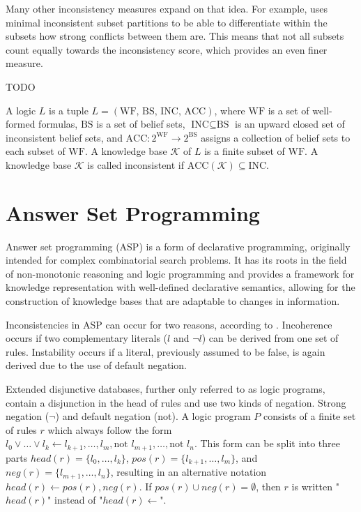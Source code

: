Many other inconsistency measures expand on that idea. For example, \cite{jabbour_mis_2016} uses minimal inconsistent subset partitions to be able to differentiate within the subsets how strong conflicts between them are. This means that not all subsets count equally towards the inconsistency score, which provides an even finer measure.

TODO
\begin{definition}
    A logic \(L\) is a tuple \(L = (\text{WF, BS, INC, ACC})\), where \(\text{WF}\) is a set of well-formed formulas, \(\text{BS}\) is a set of belief sets, \(\text{INC} \subseteq \text{BS}\) is an upward closed set of inconsistent belief sets, and \(\text{ACC}: 2^{\text{WF}} \rightarrow 2^{\text{BS}}\) assigns a collection of belief sets to each subset of \(\text{WF}\). A knowledge base \(\mathcal{K}\) of \(L\) is a finite subset of \(\text{WF}\). A knowledge base \(\mathcal{K}\) is called inconsistent if \(\text{ACC}(\mathcal{K}) \subseteq \text{INC}\).
\end{definition}

\section{Answer Set Programming}
Answer set programming (ASP) \cite{gelfond_logic_2002} is a form of declarative programming, originally intended for complex combinatorial search problems. It has its roots in the field of non-monotonic reasoning and logic programming and provides a framework for knowledge representation with well-defined declarative semantics, allowing for the construction of knowledge bases that are adaptable to changes in information.

Inconsistencies in ASP can occur for two reasons, according to \cite{calimeri_characterising_2015}. Incoherence occurs if two complementary literals (\(l\) and \(\neg l\)) can be derived from one set of rules. Instability occurs if a literal, previously assumed to be false, is again derived due to the use of default negation.

Extended disjunctive databases, further only referred to as logic programs, contain a disjunction in the head of rules and use two kinds of negation. Strong negation (\(\neg\)) and default negation (not). A logic program \(P\) consists of a finite set of rules \(r\) which always follow the form \(l_0 \lor \dots \lor l_k \leftarrow l_{k+1}, \dots, l_m, \text{not } l_{m+1}, \dots, \text{not }l_n\). This form can be split into three parts \(head(r) = \{l_0, \dots, l_k\}\), \(pos(r) = \{l_{k+1}, \dots, l_m\}\), and \(neg(r) = \{l_{m+1}, \dots, l_n\}\), resulting in an alternative notation \(head(r) \leftarrow pos(r), neg(r)\). If \(pos(r) \cup neg(r) = \emptyset\), then \(r\) is written "\(head(r)\)" instead of "\(head(r) \leftarrow\)".

